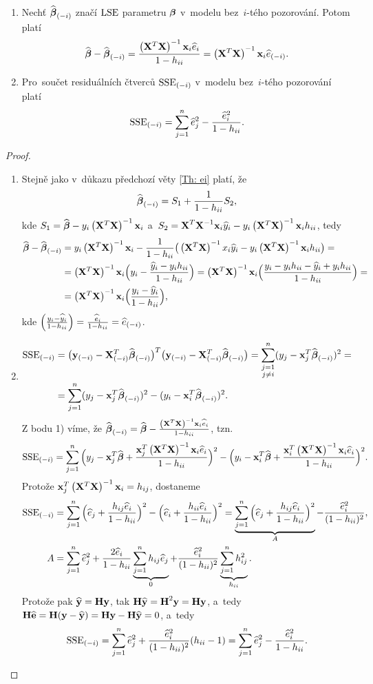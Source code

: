 \begin{theorem}
	\begin{enumerate}[1)]
		\item Nechť $\mini{\wbetab}$ značí $\LSE$ parametru $\betab$ v~modelu bez~$i$-tého pozorování. Potom platí
	 $$ \wbetab-\mini{\wbetab} = \frac{\xtx \x_i\hei}{1-\hii} = \xtx \x_i\mini{\he}. $$
	\item Pro~součet residuálních čtverců $\mini{\SSE}$ v~modelu bez~$i$-tého pozorování platí
	 $$ \mini{\SSE} = \sumjn \he_j^2-\frac{\he_i^2}{1-\hii}. $$
	\end{enumerate}

\begin{proof}
	\begin{enumerate}[1)]
		\item Stejně jako v~důkazu předchozí věty \ref{Th: ei} platí, že
		 $$ \mini{\wbetab} = S_1+\frac{1}{1-\hii}S_2, $$
		kde $S_1 = \wbetab-y_i\xtx \x_i$ a~$S_2 = \inv{\textbf{X}^T\textbf{X}}\x_i\hyi-y_i\xtx  \x_i\hii$, tedy
		\[
		\begin{split}
		\wbetab-\mini{\wbetab}& = y_i\xtx \x_i-\frac{1}{1-\hii}\big(\xtx  x_i\hyi-y_i\xtx  \x_i\hii\big) = \\& = \xtx  \x_i\Big(y_i-\frac{\hyi-y_i\hii}{1-\hii}\Big) = \xtx  \x_i\Big(\frac{y_i-y_i\hii-\hyi+y_i\hii}{1-\hii}\Big) = \\& = \xtx  \x_i\Big(\frac{y_i-\hyi}{1-\hii}\Big),
		\end{split}
		\]
		kde $\Big(\frac{y_i-\hyi}{1-\hii}\Big) = \frac{\hei}{1-\hii} = \mini{\he}$.
		\item \[
		\begin{split}
		\mini{\SSE}& = \big(\mini{\y}-\mini{\X}^T\mini{\wbetab}\big)^T\big(\mini{\y}-\mini{\X}^T\mini{\wbetab}\big) = \sum_{\substack{j = 1\\j\neq i}}^n(y_j-\x_j^T\mini{\wbetab})^2 = \\& = \sumjn (y_j-\x_j^T\mini{\wbetab})^2-(y_i-\x_i^T\mini{\wbetab})^2.
		\end{split}
		\]
		Z bodu 1) víme, že $\mini{\wbetab} = \wbetab-\frac{\xtx  \x_i\hei}{1-\hii}$, tzn.
		 $$ \mini{\SSE} = \sumjn\Big(y_j-\x_j^T\wbetab+\frac{\x_j^T\xtx  \x_i\hei}{1-\hii}\Big)^2-\Big(y_i-\x_i^T\wbetab+\frac{\x_i^T\xtx  \x_i\hei}{1-\hii}\Big)^2. $$
		Protože $\x_j^T\xtx  \x_i = h_{ij}$, dostaneme
		\[
	\begin{split}
	\mini{\SSE}& = \sumjn \Big(\he_j+\frac{h_{ij}\hei}{1-\hii}\Big)^2-\Big(\he_i+\frac{h_{ii}\hei}{1-\hii}\Big)^2 = \underbrace{\sumjn\Big(\he_j+\frac{h_{ij}\hei}{1-\hii}\Big)^2}_A-\frac{\hei^2}{(1-\hii)^2},\\
	A& = \sumjn \he_j^2+\frac{2\hei}{1-\hii}\underbrace{\sumjn h_{ij}\he_j}_0+\frac{\hei^2}{(1-\hii)^2}\underbrace{\sumjn h_{ij}^2}_{\hii}.
	\end{split}
	\]
		Protože pak $\hyb = \Hm\y$, tak $\Hm\hyb = \Hm^2\y = \Hm\y$, a~tedy $\Hm\heb = \Hm(\y-\hyb) = \Hm\y-\Hm\hyb = 0$, a~tedy
		 $$ \mini{\SSE} = \sumjn\he_j^2+\frac{\hei^2}{(1-\hii)^2}(\hii-1) = \sumjn\he_j^2-\frac{\hei^2}{1-\hii}. $$
	\end{enumerate}
\end{proof}
\end{theorem}

